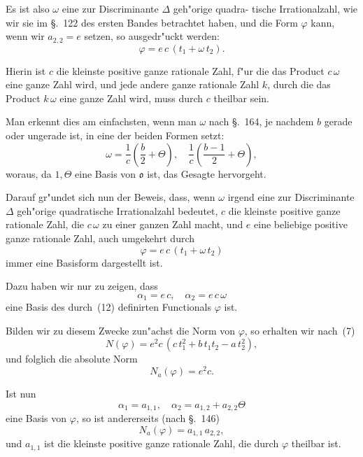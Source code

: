 \documentclass[12pt,a4paper]{article}
\theoremstyle{weber}
\begin{document}
Es ist also $\omega$ eine zur Discriminante $\varDelta$ geh"orige quadra-
tische Irrationalzahl, wie wir sie im \S.~122 des ersten Bandes
betrachtet haben, und die Form $\varphi$ kann, wenn wir $a_{2,2} = e$
setzen, so ausgedr"uckt werden:
\begin{equation}\label{eq:s166-10}
\varphi = e\,c\,(t_1 + \omega\,t_2).
\end{equation}

Hierin ist $c$ die kleinste positive ganze rationale Zahl, f"ur
die das Product $c\,\omega$ eine ganze Zahl wird, und jede andere
ganze rationale Zahl $k$, durch die das Product $k\,\omega$ eine ganze
Zahl wird, muss durch $c$ theilbar sein.

Man erkennt dies am einfachsten, wenn man $\omega$ nach \S.~164,
je nachdem $b$ gerade oder ungerade ist, in eine der beiden
Formen setzt:
\begin{equation}\label{eq:s166-11}
\omega = \frac{1}{c}\left(\frac{b}{2} + \varTheta\right), \quad \frac{1}{c}\left(\frac{b-1}{2} + \varTheta\right),
\end{equation}
woraus, da $1, \varTheta$ eine Basis von $\mathfrak{o}$ ist, das Gesagte hervorgeht.

Darauf gr"undet sich nun der Beweis, dass, wenn $\omega$ irgend
eine zur Discriminante $\varDelta$ geh"orige quadratische Irrationalzahl
bedeutet, $c$ die kleinste positive ganze rationale Zahl, die $c\,\omega$ zu
einer ganzen Zahl macht, und $e$ eine beliebige positive ganze
rationale Zahl, auch umgekehrt durch
\begin{equation}\label{eq:s166-12}
\varphi = e\,c\,(t_1 + \omega\,t_2)
\end{equation}
immer eine Basisform dargestellt ist.

Dazu haben wir nur zu zeigen, dass
\[
\alpha_1 = e\,c, \quad \alpha_2 = e\,c\,\omega
\]
eine Basis des durch~(12) definirten Functionals $\varphi$ ist.

Bilden wir zu diesem Zwecke zun"achst die Norm von $\varphi$, so
erhalten wir nach~(7)
\begin{equation}\label{eq:s166-13}
N(\varphi) = e^2c\,(c\,t_1^2 + b\,t_1t_2 - a\,t_2^2),
\end{equation}
und folglich die absolute Norm
\begin{equation}\label{eq:s166-14}
N_a(\varphi) = e^2c.
\end{equation}

Ist nun
\begin{equation}\label{eq:s166-15}
\alpha_1 = a_{1,1}, \quad \alpha_2 = a_{1,2} + a_{2,2}\varTheta
\end{equation}
eine Basis von $\varphi$, so ist andererseits (nach \S.~146)
\begin{equation}\label{eq:s166-16}
N_a(\varphi) = a_{1,1}\,a_{2,2},
\end{equation}
und $a_{1,1}$ ist die kleinste positive ganze rationale Zahl, die durch
$\varphi$ theilbar ist.
\end{document}
